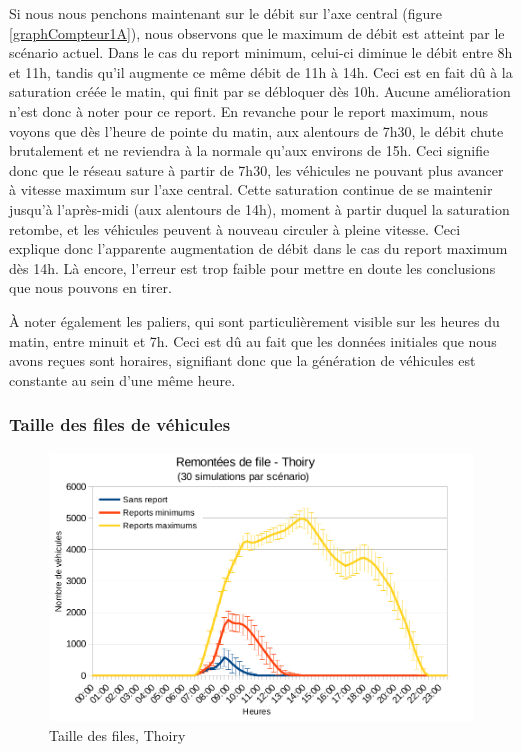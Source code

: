 \documentclass[a4paper,11pt, titlepage]{extarticle}
\begin{document}
Si nous nous penchons maintenant sur le débit sur l'axe central (figure \ref{graphCompteur1A}), nous observons que le maximum de débit est atteint par le scénario actuel. Dans le cas du report minimum, celui-ci diminue le débit entre 8h et 11h, tandis qu'il augmente ce même débit de 11h à 14h. Ceci est en fait dû à la saturation créée le matin, qui finit par se débloquer dès 10h. Aucune amélioration n'est donc à noter pour ce report. En revanche pour le report maximum, nous voyons que dès l'heure de pointe du matin, aux alentours de 7h30, le débit chute brutalement et ne reviendra à la normale qu'aux environs de 15h. Ceci signifie donc que le réseau sature à partir de 7h30, les véhicules ne pouvant plus avancer à vitesse maximum sur l'axe central. Cette saturation continue de se maintenir jusqu'à l'après-midi (aux alentours de 14h), moment à partir duquel la saturation retombe, et les véhicules peuvent à nouveau circuler à pleine vitesse. Ceci explique donc l'apparente augmentation de débit dans le cas du report maximum dès 14h. Là encore, l'erreur est trop faible pour mettre en doute les conclusions que nous pouvons en tirer. 

\vspace{0.4cm}

À noter également les paliers, qui sont particulièrement visible sur les heures du matin, entre minuit et 7h. Ceci est dû au fait que les données initiales que nous avons reçues sont horaires, signifiant donc que la génération de véhicules est constante au sein d'une même heure. 

\newpage

\subsubsection{Taille des files de véhicules}

\begin{figure}[!h]
  \begin{center}
    \includegraphics[width=12cm]{graphiques/leakyB_thoiry_scenario1.png}
  \end{center}
  \vspace{-0.8cm}
  \caption{Taille des files, Thoiry}
  \label{graphLBThoiry}
\end{figure}
\end{document}

